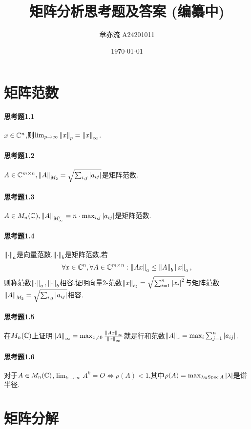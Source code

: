 \documentclass[11pt]{article}
\title{矩阵分析思考题及答案 (编纂中)}
\author{章亦流 A24201011}
\date{\today}
\begin{document}
\maketitle
\tableofcontents
\section{矩阵范数}
\paragraph{思考题1.1}$x\in \mathbb{C}^n$,则$\lim_{p\to\infty}\left\|x\right\|_p=\left\|x\right\|_\infty$.

\paragraph{思考题1.2}$A\in \mathbb{C}^{m\times n}, \left\|A\right\|_{M_2}=\sqrt{\sum_{i,j} \left|a_{ij}\right|}$是矩阵范数.

\paragraph{思考题1.3}$A\in M_n(\mathbb{C}), \left\|A\right\|_{M'_\infty}=n\cdot \max_{i,j}\left|a_{ij}\right|$是矩阵范数.

\paragraph{思考题1.4}$\left\|\cdot\right\|_a$是向量范数,$\left\|\cdot\right\|_b$是矩阵范数,若
$$\forall x\in \mathbb{C}^{n}, \forall A\in \mathbb{C}^{m\times n}: \left\|Ax\right\|_a\leq \left\|A\right\|_b\left\|x\right\|_a,$$
则称范数$\left\|\cdot\right\|_a,\left\|\cdot\right\|_b$相容.证明向量2-范数$\left\|x\right\|_{\ell_2}=\sqrt{\sum_{i=1}^{n}\left|x_i\right|^2}$与矩阵范数$\left\|A\right\|_{M_2}=\sqrt{\sum_{i,j} \left|a_{ij}\right|}$相容.

\paragraph{思考题1.5}在$M_n(\mathbb{C})$上证明$\left\|A\right\|_\infty=\max_{x\neq 0}\frac{\left\|Ax\right\|_{\infty}}{\left\|x\right\|_\infty}$就是行和范数$\left\|A\right\|_{r}=\max_{i}\sum_{j=1}^{n}\left|a_{ij}\right|$.

\paragraph{思考题1.6}对于$A\in M_n(\mathbb{C})$,$\lim_{k\to\infty}A^k=O \iff \rho(A)<1$,其中$\rho(A)=\max_{\lambda\in \operatorname{Spec} A}\left|\lambda\right|$是谱半径.

\section{矩阵分解}
\end{document}
